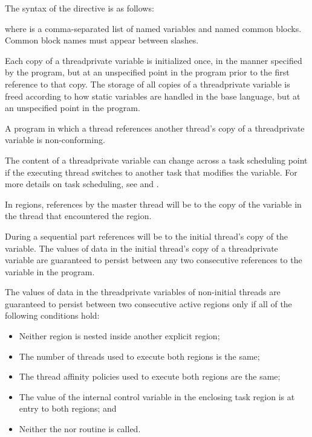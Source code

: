 \begin{fortranspecific}
The syntax of the  directive is as follows:


where  is a comma-separated list of named variables and named common blocks.
Common block names must appear between slashes.
\end{fortranspecific}

\descr
Each copy of a threadprivate variable is initialized once, in the manner specified 
by the program, but at an unspecified point in the program prior to the first 
reference to that copy. The storage of all copies of a threadprivate variable is 
freed according to how static variables are handled in the base language, but at 
an unspecified point in the program.

A program in which a thread references another thread's copy of a threadprivate 
variable is non-conforming.

The content of a threadprivate variable can change across a task scheduling point 
if the executing thread switches to another task that modifies the variable. For 
more details on task scheduling, see  and
.

In  regions, references by the master thread will be to the copy of the
variable in the thread that encountered the  region.

During a sequential part references will be to the initial thread's copy of the 
variable. The values of data in the initial thread's copy of a threadprivate 
variable are guaranteed to persist between any two consecutive references to 
the variable in the program.

The values of data in the threadprivate variables of non-initial threads
are guaranteed to persist between two consecutive active 
regions only if all of the following conditions hold:

\begin{itemize} 
\item Neither  region is nested inside another explicit 
       region;
\item The number of threads used to execute both  regions is the same;
\item The thread affinity policies used to execute both  
      regions are the same;
\item The value of the  internal control variable in the enclosing 
      task region is  at entry to both  regions; and
\item Neither the  nor  
      routine is called.
\end{itemize}

